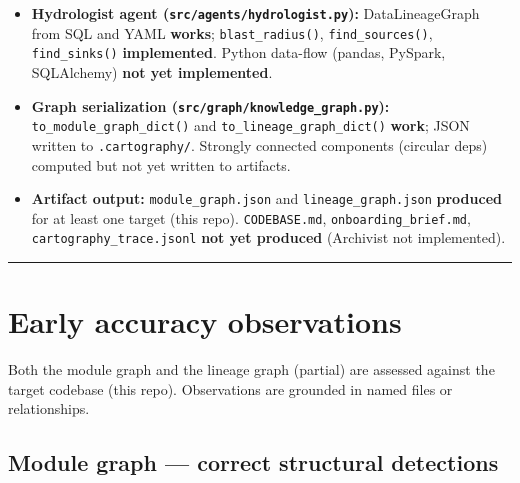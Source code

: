 \documentclass[11pt,a4paper]{article}
\begin{document}
\begin{itemize}[leftmargin=*]
  \item \textbf{Hydrologist agent (\texttt{src/agents/hydrologist.py}):} DataLineageGraph from SQL and YAML \textbf{works}; \texttt{blast\_radius()}, \texttt{find\_sources()}, \texttt{find\_sinks()} \textbf{implemented}. Python data-flow (pandas, PySpark, SQLAlchemy) \textbf{not yet implemented}.
  \item \textbf{Graph serialization (\texttt{src/graph/knowledge\_graph.py}):} \texttt{to\_module\_graph\_dict()} and \texttt{to\_lineage\_graph\_dict()} \textbf{work}; JSON written to \texttt{.cartography/}. Strongly connected components (circular deps) computed but not yet written to artifacts.
  \item \textbf{Artifact output:} \texttt{module\_graph.json} and \texttt{lineage\_graph.json} \textbf{produced} for at least one target (this repo). \texttt{CODEBASE.md}, \texttt{onboarding\_brief.md}, \texttt{cartography\_trace.jsonl} \textbf{not yet produced} (Archivist not implemented).
\end{itemize}

\vspace{1em}
\hrule
\vspace{1em}

\section{Early accuracy observations}

Both the module graph and the lineage graph (partial) are assessed against the target codebase (this repo). Observations are grounded in named files or relationships.

\subsection{Module graph — correct structural detections}
\end{document}
